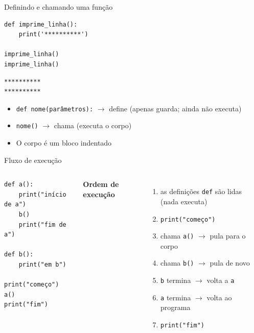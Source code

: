 \documentclass[aspectratio=169,10pt,t]{beamer}
\begin{document}
\begin{frame}[fragile]{Definindo e chamando uma função}
\begin{lstlisting}
def imprime_linha():
    print('**********')

imprime_linha()
imprime_linha()
\end{lstlisting}
\begin{lstlisting}[style=saida]
**********
**********
\end{lstlisting}
  \begin{itemize}
    \item \texttt{def nome(parâmetros):} \(\to\) \alert{define} (apenas guarda; ainda não executa)
    \item \texttt{nome()} \(\to\) \alert{chama} (executa o corpo)
    \item O corpo é um bloco indentado
  \end{itemize}
\end{frame}

\begin{frame}[fragile]{Fluxo de execução}
  \begin{columns}[T]
\begin{lstlisting}
def a():
    print("início de a")
    b()
    print("fim de a")

def b():
    print("em b")

print("começo")
a()
print("fim")
\end{lstlisting}
    \textbf{Ordem de execução}
    \begin{enumerate}\small
      \item as definições \texttt{def} são lidas (nada executa)
      \item \texttt{print("começo")}
      \item chama \texttt{a()} \(\to\) pula para o corpo
      \item chama \texttt{b()} \(\to\) pula de novo
      \item \texttt{b} termina \(\to\) volta a \texttt{a}
      \item \texttt{a} termina \(\to\) volta ao programa
      \item \texttt{print("fim")}
    \end{enumerate}
  \end{columns}
\end{frame}
\end{document}
